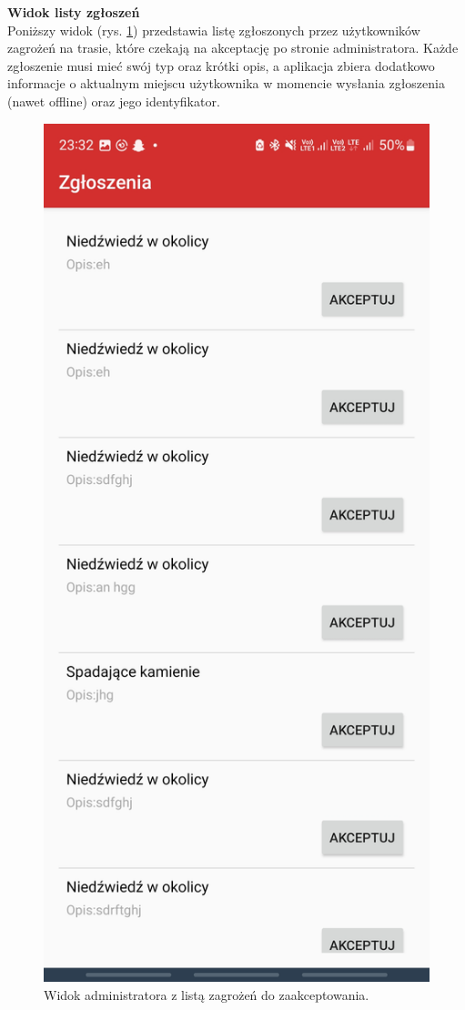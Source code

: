 
\textbf{Widok listy zgłoszeń}\\
\indent Poniższy widok (rys. \ref{widok:adminaccept}) przedstawia listę zgłoszonych przez użytkowników zagrożeń na trasie, które czekają na akceptację po stronie administratora. Każde zgłoszenie musi mieć swój typ oraz krótki opis, a aplikacja zbiera dodatkowo informacje o aktualnym miejscu użytkownika w momencie wysłania zgłoszenia (nawet offline) oraz jego identyfikator.
\begin{figure}[H]
    \centering
    \includegraphics[scale=0.15]{img/imp/widok-admin-accept.jpg}
    \caption{Widok administratora z listą zagrożeń do zaakceptowania.}
    \label{widok:adminaccept}
\end{figure}


